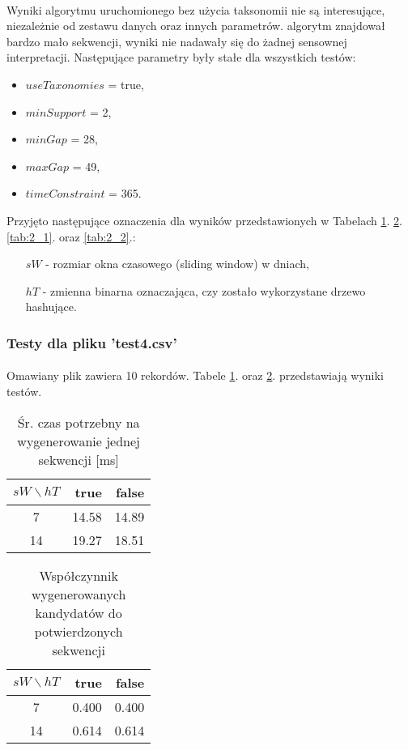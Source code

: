 \documentclass[11pt,a4paper]{article}
\begin{document}
\paragraph{} Wyniki algorytmu uruchomionego bez użycia taksonomii nie są interesujące, niezależnie od zestawu danych oraz innych parametrów. algorytm znajdował bardzo mało sekwencji, wyniki nie nadawały się do żadnej sensownej interpretacji. Następujące parametry były stałe dla wszystkich testów:
\begin{itemize}
\item $useTaxonomies$ = true,
\item $minSupport$ = 2,
\item $minGap$ = 28,
\item $maxGap$ = 49,
\item $timeConstraint$ = 365.
\end{itemize}
Przyjęto następujące oznaczenia dla wyników przedstawionych w Tabelach \ref{tab:1_1}. \ref{tab:1_2}. \ref{tab:2_1}. oraz \ref{tab:2_2}.:
\begin{itemize}
\item[$sW$ - ]rozmiar okna czasowego (sliding window) w dniach,
\item[$hT$ - ]zmienna binarna oznaczająca, czy zostało wykorzystane drzewo hashujące.
\end{itemize}

\subsubsection{Testy dla pliku 'test4.csv'}
\label{subsec:test}
\paragraph{} Omawiany plik zawiera 10 rekordów. Tabele \ref{tab:1_1}. oraz \ref{tab:1_2}. przedstawiają wyniki testów.

\begin{table}[!hbt]
\caption{Śr. czas potrzebny na wygenerowanie jednej sekwencji [ms]}
\centering
\begin{tabular}{|c|r|r|}
\hline
$sW\backslash hT$	& true	& false	\\[1.2ex]\hline
7					& 14.58	& 14.89	\\[1ex]\hline
14					& 19.27	& 18.51	\\[1ex]\hline
\end{tabular}
\label{tab:1_1}
\end{table}

\begin{table}[!hbt]
\caption{Współczynnik wygenerowanych kandydatów do potwierdzonych sekwencji}
\centering
\begin{tabular}{|c|r|r|}
\hline
$sW\backslash hT$	& true	& false	\\[1.2ex]\hline
7					& 0.400	& 0.400	\\[1ex]\hline
14					& 0.614	& 0.614	\\[1ex]\hline
\end{tabular}
\label{tab:1_2}
\end{table}
\end{document}
